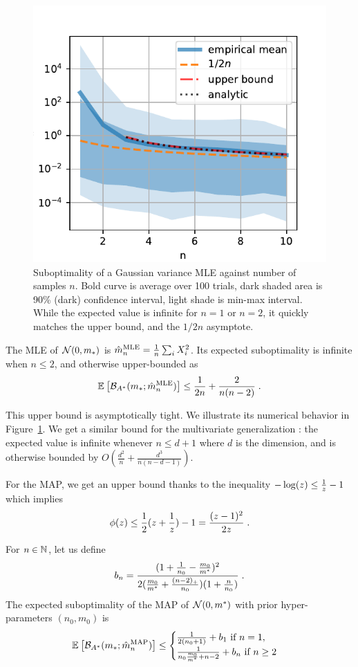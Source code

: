 \documentclass[twoside]{article}
\newcommand*{\expect}[2][]{\ensuremath{\mathbb{E}_{#1} \left[ #2 \right] }} %
\newcommand{\logpart}{A}
\newcommand{\bregmanconj}{\cB_{\logpart^*}}
\newcommand{\m}{m}
\begin{document}
\begin{figure}[ht]
	\centering
\includegraphics[width=.4\textwidth]{fewsamples.pdf}
	\caption{Suboptimality of a Gaussian variance MLE against number of samples $n$. Bold curve is average over 100 trials,  dark shaded area is 90\% (dark) confidence interval, light shade is min-max interval. 
		While the expected value is infinite for $n=1$ or $n=2$, it quickly matches the upper bound, and the $1/2n$ asymptote.
	}
	\label{fig:curves}
\end{figure}


\begin{theorem}
	The MLE of $\cN(0,\m_*)$ is $\hat \m_n^\text{MLE} = \inv{n} \sum_i X_i^2 $.
	Its expected suboptimality is infinite when $n\leq 2$, and otherwise upper-bounded as
	\begin{align}
		 \expect{\bregmanconj( \m_*; \hat \m_n^\text{MLE}) }
			\leq \inv{2n} +\frac{2}{n(n-2)} \; .
			\label{eq:MLE_rate}
	\end{align}
\end{theorem}

This upper bound is asymptotically tight.
We illustrate its numerical behavior in Figure~\ref{fig:curves}.
We get a similar bound for the multivariate generalization :
the expected value is infinite whenever $n \leq d+1$ where $d$ is the dimension, and is otherwise bounded by $O(\frac{d^2}{n} + \frac{d^3}{n(n-d-1)} )$.
  
For the MAP, we get an upper bound thanks to the inequality $ - \log(z) \leq \frac{1}{z} - 1$ which implies
\begin{align}
	\label{eq:log_bound} 
	\phi(z) \leq \frac{1}{2} (z + \frac{1}{z}) - 1 = \frac{(z-1)^2}{2 z} \; .
\end{align}

\begin{theorem}
 For $n\in \mathbb{N}$, let us  define
 \begin{align}
	b_n = \frac{(1 + \inv{n_0} - \frac{\m_0}{\m^*})^2}{2 (\frac{\m_0}{\m^*}+\frac{(n-2)_+}{n_0})(1 + \frac{n}{n_0} )} \; .
 \end{align}
The expected suboptimality of the MAP of $\cN(0,\m^*)$ with prior hyper-parameters $(n_0,\m_0)$ is
 \begin{equation}
	\expect{\bregmanconj( \m_*; \hat \m_n^\mathrm{MAP})}
	\leq \begin{cases}
		\inv{2(n_0+1)}  +  b_1 \ \text{if}\ n=1,\\
		\frac{1}{n_0 \frac{\m_0}{\m^*} +n-2} + b_n \ \text{if}\ n\geq 2
	\end{cases}
	\label{eq:MAP_rate}
\end{equation}
\end{theorem}
\end{document}
